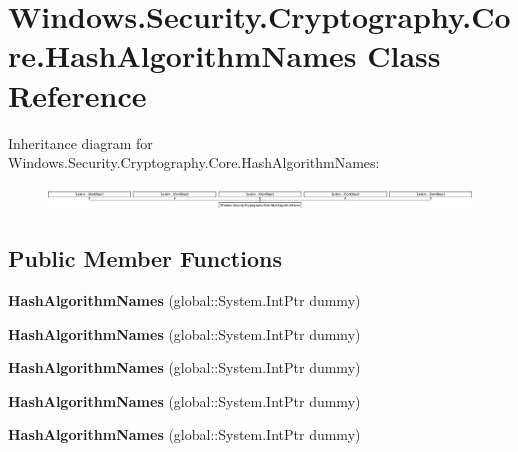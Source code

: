 \hypertarget{class_windows_1_1_security_1_1_cryptography_1_1_core_1_1_hash_algorithm_names}{}\section{Windows.\+Security.\+Cryptography.\+Core.\+Hash\+Algorithm\+Names Class Reference}
\label{class_windows_1_1_security_1_1_cryptography_1_1_core_1_1_hash_algorithm_names}
Inheritance diagram for Windows.\+Security.\+Cryptography.\+Core.\+Hash\+Algorithm\+Names\+:\begin{figure}[H]
\begin{center}
\leavevmode
\includegraphics[height=0.623955cm]{class_windows_1_1_security_1_1_cryptography_1_1_core_1_1_hash_algorithm_names}
\end{center}
\end{figure}
\subsection*{Public Member Functions}
\begin{DoxyCompactItemize}
\item 
\mbox{\label{class_windows_1_1_security_1_1_cryptography_1_1_core_1_1_hash_algorithm_names_a7128f4486cf60f32630dde61493f5b50}} 
{\bfseries Hash\+Algorithm\+Names} (global\+::\+System.\+Int\+Ptr dummy)
\item 
\mbox{\label{class_windows_1_1_security_1_1_cryptography_1_1_core_1_1_hash_algorithm_names_a7128f4486cf60f32630dde61493f5b50}} 
{\bfseries Hash\+Algorithm\+Names} (global\+::\+System.\+Int\+Ptr dummy)
\item 
\mbox{\label{class_windows_1_1_security_1_1_cryptography_1_1_core_1_1_hash_algorithm_names_a7128f4486cf60f32630dde61493f5b50}} 
{\bfseries Hash\+Algorithm\+Names} (global\+::\+System.\+Int\+Ptr dummy)
\item 
\mbox{\label{class_windows_1_1_security_1_1_cryptography_1_1_core_1_1_hash_algorithm_names_a7128f4486cf60f32630dde61493f5b50}} 
{\bfseries Hash\+Algorithm\+Names} (global\+::\+System.\+Int\+Ptr dummy)
\item 
\mbox{\label{class_windows_1_1_security_1_1_cryptography_1_1_core_1_1_hash_algorithm_names_a7128f4486cf60f32630dde61493f5b50}} 
{\bfseries Hash\+Algorithm\+Names} (global\+::\+System.\+Int\+Ptr dummy)
\end{DoxyCompactItemize}
